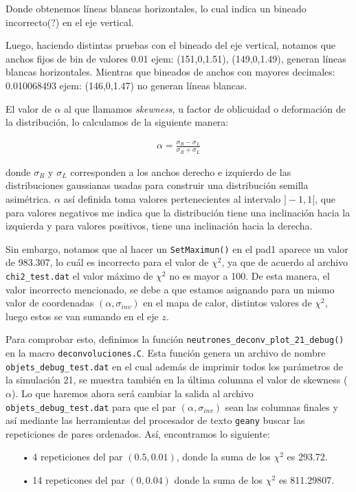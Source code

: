 \documentclass[11pt,letterpaper]{article}
\begin{document}
Donde obtenemos líneas blancas horizontales, lo cual indica un bineado incorrecto(?) en el eje vertical.

Luego, haciendo distintas pruebas con el bineado del eje vertical, notamos que anchos fijos de bin de valores 0.01 ejem: (151,0,1.51), (149,0,1.49), generan líneas blancas horizontales. Mientras que bineados de anchos con mayores decimales: 0.010068493 ejem: (146,0,1.47) no generan líneas blancas.

El valor de $\alpha$ al que llamamos \textit{skewness}, u factor de oblicuidad o deformación de la distribución, lo calculamos de la siguiente manera:

\begin{align}
\alpha = \frac{\sigma_R-\sigma_L}{\sigma_R+\sigma_L}
\label{alpha_cust}
\end{align}

donde $\sigma_R$ y $\sigma_L$ corresponden a los anchos derecho e izquierdo de las distribuciones gaussianas usadas para construir una distribución semilla asimétrica. $\alpha$ así definida toma valores pertenecientes al intervalo $]-1,1[$, que para valores negativos me indica que la distribución tiene una inclinación hacia la izquierda y para valores positivos, tiene una inclinación hacia la derecha.

Sin embargo, notamos que al hacer un \verb|SetMaximun()| en el pad1 aparece un valor de 983.307, lo cuál es incorrecto para el valor de $\chi^2$, ya que de acuerdo al archivo \verb|chi2_test.dat| el valor máximo de $\chi^2$ no es mayor a 100. De esta manera, el valor incorrecto mencionado, se debe a que estamos asignando para un mismo valor de coordenadas $(\alpha,\sigma_{inv})$ en el mapa de calor, distintos valores de $\chi^2$, luego estos se van sumando en el eje $z$.

Para comprobar esto, definimos la función \verb|neutrones_deconv_plot_21_debug()| en la macro \verb|deconvoluciones.C|. Esta función genera un archivo de nombre \verb|objets_debug_test.dat| en el cual además de imprimir todos los parámetros de la simulación 21, se muestra también en la última columna el valor de skewness ($\alpha$). \newline
Lo que haremos ahora será cambiar la salida al archivo \verb|objets_debug_test.dat| para que el par $(\alpha,\sigma_{inv})$ sean las columnas finales y así mediante las herramientas del procesador de texto \verb|geany| buscar las repeticiones de pares ordenados. Así, encontramos lo siguiente:

\begin{itemize}
\item[•] 4 repeticiones del par $(0.5, 0.01)$, donde la suma de los $\chi^2$ es 293.72.
\item[•] 14 repeticones del par $(0,0.04)$ donde la suma de los $\chi^2$ es 811.29807.
\end{itemize}
\end{document}
